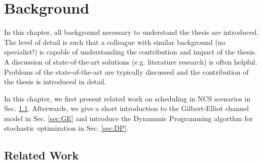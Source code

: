 \chapter{Background}

In this chapter, all background necessary to understand the thesis are
introduced. The level of detail is such that a colleague with similar background
(no specialist!) is capable of understanding the contribution and impact of the
thesis. A discussion of state-of-the-art solutions (e.g. literature research) is
often helpful. Problems of the state-of-the-art are typically discussed and the
contribution of the thesis is introduced in detail. 

In this chapter, we first present related work on scheduling in NCS scenarios in
Sec. \ref{sec:survey}. Afterwards, we give a short introduction to the
Gilbert-Elliot channel model in Sec. \ref{sec:GE} and introduce the Dynammic
Programming algorthm for stochastic optimization in Sec. \ref{sec:DP}.

\section{Related Work} \label{sec:survey}
